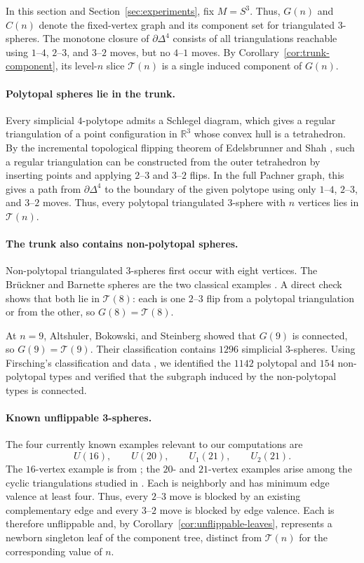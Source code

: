 \documentclass[11pt]{article}
\theoremstyle{remark}
\theoremstyle{plain}
\begin{document}
In this section and Section~\ref{sec:experiments}, fix \(M=S^3\).  Thus,
\(G(n)\) and \(C(n)\) denote the fixed-vertex graph and its component set for
triangulated \(3\)-spheres.  The monotone closure of \(\partial\Delta^4\)
consists of all triangulations reachable using
\(1\)--\(4\), \(2\)--\(3\), and \(3\)--\(2\) moves, but no
\(4\)--\(1\) moves.  By Corollary~\ref{cor:trunk-component}, its
level-\(n\) slice \(\mathcal T(n)\) is a single induced component of
\(G(n)\).

\paragraph{Polytopal spheres lie in the trunk.}
Every simplicial \(4\)-polytope admits a Schlegel diagram, which gives a
regular triangulation of a point configuration in \(\mathbb R^3\) whose
convex hull is a tetrahedron.  By the incremental topological flipping
theorem of Edelsbrunner and Shah \cite{ES96}, such a regular triangulation
can be constructed from the outer tetrahedron by inserting points and
applying \(2\)--\(3\) and \(3\)--\(2\) flips.  In the full Pachner graph,
this gives a path from \(\partial\Delta^4\) to the boundary of the given
polytope using only \(1\)--\(4\), \(2\)--\(3\), and \(3\)--\(2\) moves.
Thus, every polytopal triangulated \(3\)-sphere with \(n\) vertices lies in
\(\mathcal T(n)\).

\paragraph{The trunk also contains non-polytopal spheres.}
Non-polytopal triangulated \(3\)-spheres first occur with eight vertices.  The
Br\"uckner and Barnette spheres are the two classical examples
\cite{GS67,Bar73}.  A direct check shows that both lie in
\(\mathcal T(8)\): each is one \(2\)--\(3\) flip from a polytopal
triangulation or from the other, so \(G(8)=\mathcal T(8)\).

At \(n=9\), Altshuler, Bokowski, and Steinberg \cite{ABS80} showed that
\(G(9)\) is connected, so \(G(9)=\mathcal T(9)\).  Their classification
contains \(1296\) simplicial \(3\)-spheres.  Using Firsching's classification
and data \cite{F20,F-Data}, we identified the \(1142\) polytopal and \(154\)
non-polytopal types and verified that the subgraph induced by the
non-polytopal types is connected.

\paragraph{Known unflippable 3-spheres.}
The four currently known examples relevant to our computations are
\[
 U(16),\qquad U(20),\qquad U_1(21),\qquad U_2(21).
\]
The \(16\)-vertex example is from \cite{DFM04}; the \(20\)- and
\(21\)-vertex examples arise among the cyclic triangulations studied in
\cite{S14}.  Each is neighborly and has minimum edge valence at least four.
Thus, every \(2\)--\(3\) move is blocked by an existing complementary edge
and every \(3\)--\(2\) move is blocked by edge valence.  Each is therefore
unflippable and, by Corollary~\ref{cor:unflippable-leaves}, represents a
newborn singleton leaf of the component tree, distinct from
\(\mathcal T(n)\) for the corresponding value of \(n\).
\end{document}

